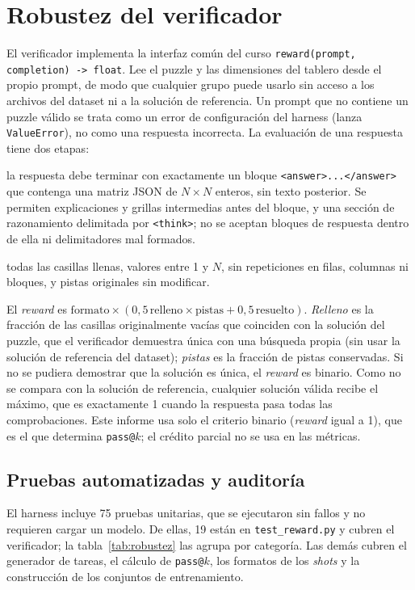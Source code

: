 \section{Robustez del verificador}
\label{sec:robustez}

El verificador implementa la interfaz común del curso
\texttt{reward(prompt, completion) -> float}. Lee el puzzle y las
dimensiones del tablero desde el propio prompt, de modo que cualquier
grupo puede usarlo sin acceso a los archivos del dataset ni a la solución
de referencia. Un prompt que no contiene un puzzle válido se trata como un
error de configuración del harness (lanza \texttt{ValueError}), no como una
respuesta incorrecta. La evaluación de una respuesta tiene dos etapas:

\begin{description}[leftmargin=0pt]
  \item[Contrato de formato:] la respuesta debe terminar con exactamente un
  bloque \texttt{<answer>...</answer>} que contenga una matriz JSON de
  $N \times N$ enteros, sin texto posterior. Se permiten explicaciones y
  grillas intermedias antes del bloque, y una sección de razonamiento
  delimitada por \texttt{<think>}; no se aceptan bloques de respuesta
  dentro de ella ni delimitadores mal formados.
  \item[Reglas del Sudoku:] todas las casillas llenas, valores entre 1 y
  $N$, sin repeticiones en filas, columnas ni bloques, y pistas originales
  sin modificar.
\end{description}

El \emph{reward} es $\text{formato} \times (0{,}5\,\text{relleno} \times
\text{pistas} + 0{,}5\,\text{resuelto})$. \emph{Relleno} es la fracción de las
casillas originalmente vacías que coinciden con la solución del puzzle, que el
verificador demuestra única con una búsqueda propia (sin usar la solución de
referencia del dataset); \emph{pistas} es la fracción de pistas conservadas. Si no
se pudiera demostrar que la solución es única, el \emph{reward} es binario. Como
no se compara con la solución de referencia, cualquier solución válida recibe el
máximo, que es exactamente 1 cuando la respuesta pasa todas las comprobaciones.
Este informe usa solo el criterio binario (\emph{reward} igual a 1), que es el
que determina \texttt{pass@}$k$; el crédito parcial no se usa en las métricas.

\subsection{Pruebas automatizadas y auditoría}
El harness incluye 75 pruebas unitarias, que
se ejecutaron sin fallos y no requieren cargar un modelo. De ellas, 19 están en
\texttt{test\_reward.py} y cubren el verificador; la tabla~\ref{tab:robustez} las
agrupa por categoría. Las demás cubren el generador de tareas, el cálculo de
\texttt{pass@}$k$, los formatos de los \emph{shots} y la construcción de los
conjuntos de entrenamiento.

